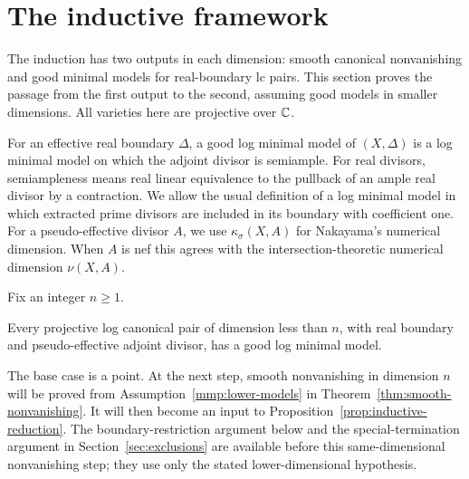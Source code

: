 \section{The inductive framework}\label{sec:induction}

The induction has two outputs in each dimension: smooth canonical
nonvanishing and good minimal models for real-boundary lc pairs.
This section proves the passage from the first output to the second,
assuming good models in smaller dimensions. All varieties here are
projective over \(\mathbb{C}\).

For an effective real boundary \(\Delta\), a good log minimal model of
\((X,\Delta)\) is a log minimal model on which the adjoint divisor is
semiample. For real divisors, semiampleness means real linear equivalence
to the pullback of an ample real divisor by a contraction. We allow the
usual definition of a log minimal model in which extracted prime
divisors are included in its boundary with coefficient one.
For a pseudo-effective divisor \(A\), we use
\(\kappa_\sigma(X,A)\) for Nakayama's numerical dimension. When \(A\)
is nef this agrees with the intersection-theoretic numerical dimension
\(\nu(X,A)\).

Fix an integer \(n\geq 1\).
\begin{assumption}\label{mmp:lower-models}
Every projective log canonical pair of dimension less than \(n\),
with real boundary and pseudo-effective adjoint divisor, has a good
log minimal model.
\end{assumption}

The base case is a point. At the next step, smooth nonvanishing in
dimension \(n\) will be proved from Assumption~\ref{mmp:lower-models}
in Theorem~\ref{thm:smooth-nonvanishing}. It will then become an input
to Proposition~\ref{prop:inductive-reduction}. The boundary-restriction
argument below and the special-termination argument in
Section~\ref{sec:exclusions} are available before this same-dimensional
nonvanishing step; they use only the stated lower-dimensional hypothesis.

